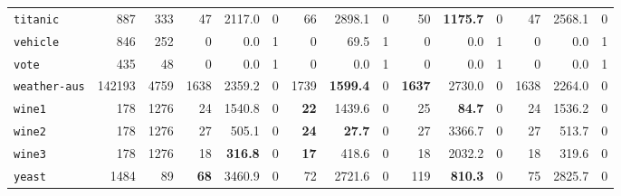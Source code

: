 \begin{tabular}{lccrrrrrrrrrrrr}
\texttt{titanic} & \multicolumn{1}{r}{887} & \multicolumn{1}{r}{333}  & 47 & 2117.0 & 0 & 66 & 2898.1 & 0 & 50 & \textbf{1175.7} & 0 & 47 & 2568.1 & 0\\
\texttt{vehicle} & \multicolumn{1}{r}{846} & \multicolumn{1}{r}{252}  & 0 & 0.0 & 1 & 0 & 69.5 & 1 & 0 & 0.0 & 1 & 0 & 0.0 & 1\\
\texttt{vote} & \multicolumn{1}{r}{435} & \multicolumn{1}{r}{48}  & 0 & 0.0 & 1 & 0 & 0.0 & 1 & 0 & 0.0 & 1 & 0 & 0.0 & 1\\
\texttt{weather-aus} & \multicolumn{1}{r}{142193} & \multicolumn{1}{r}{4759}  & 1638 & 2359.2 & 0 & 1739 & \textbf{1599.4} & 0 & \textbf{1637} & 2730.0 & 0 & 1638 & 2264.0 & 0\\
\texttt{wine1} & \multicolumn{1}{r}{178} & \multicolumn{1}{r}{1276}  & 24 & 1540.8 & 0 & \textbf{22} & 1439.6 & 0 & 25 & \textbf{84.7} & 0 & 24 & 1536.2 & 0\\
\texttt{wine2} & \multicolumn{1}{r}{178} & \multicolumn{1}{r}{1276}  & 27 & 505.1 & 0 & \textbf{24} & \textbf{27.7} & 0 & 27 & 3366.7 & 0 & 27 & 513.7 & 0\\
\texttt{wine3} & \multicolumn{1}{r}{178} & \multicolumn{1}{r}{1276}  & 18 & \textbf{316.8} & 0 & \textbf{17} & 418.6 & 0 & 18 & 2032.2 & 0 & 18 & 319.6 & 0\\
\texttt{yeast} & \multicolumn{1}{r}{1484} & \multicolumn{1}{r}{89}  & \textbf{68} & 3460.9 & 0 & 72 & 2721.6 & 0 & 119 & \textbf{810.3} & 0 & 75 & 2825.7 & 0\\
\bottomrule
\end{tabular}
